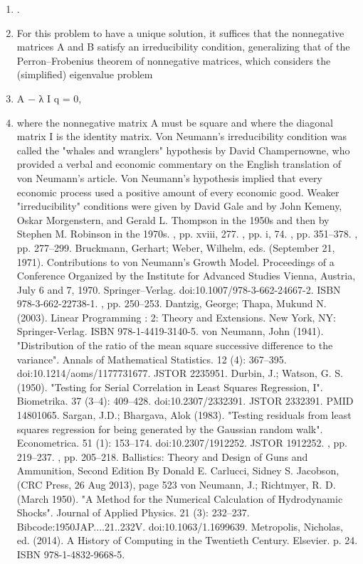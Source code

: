 \begin{enumerate}
\item .
\item For this problem to have a unique solution, it suffices that the nonnegative matrices A and B satisfy an irreducibility condition, generalizing that of the Perron–Frobenius theorem of nonnegative matrices, which considers the (simplified) eigenvalue problem
\item A − λ I q = 0,
\item where the nonnegative matrix A must be square and where the diagonal matrix I is the identity matrix. Von Neumann's irreducibility condition was called the "whales and wranglers" hypothesis by David Champernowne, who provided a verbal and economic commentary on the English translation of von Neumann's article. Von Neumann's hypothesis implied that every economic process used a positive amount of every economic good. Weaker "irreducibility" conditions were given by David Gale and by John Kemeny, Oskar Morgenstern, and Gerald L. Thompson in the 1950s and then by Stephen M. Robinson in the 1970s.
, pp. xviii, 277.
, pp. i, 74.
, pp. 351–378.
, pp. 277–299.
Bruckmann, Gerhart; Weber, Wilhelm, eds. (September 21, 1971). Contributions to von Neumann's Growth Model. Proceedings of a Conference Organized by the Institute for Advanced Studies Vienna, Austria, July 6 and 7, 1970. Springer–Verlag. doi:10.1007/978-3-662-24667-2. ISBN 978-3-662-22738-1.
, pp. 250–253.
Dantzig, George; Thapa, Mukund N. (2003). Linear Programming : 2: Theory and Extensions. New York, NY: Springer-Verlag. ISBN 978-1-4419-3140-5.
von Neumann, John (1941). "Distribution of the ratio of the mean square successive difference to the variance". Annals of Mathematical Statistics. 12 (4): 367–395. doi:10.1214/aoms/1177731677. JSTOR 2235951.
Durbin, J.; Watson, G. S. (1950). "Testing for Serial Correlation in Least Squares Regression, I". Biometrika. 37 (3–4): 409–428. doi:10.2307/2332391. JSTOR 2332391. PMID 14801065.
Sargan, J.D.; Bhargava, Alok (1983). "Testing residuals from least squares regression for being generated by the Gaussian random walk". Econometrica. 51 (1): 153–174. doi:10.2307/1912252. JSTOR 1912252.
, pp. 219–237.
, pp. 205–218.
Ballistics: Theory and Design of Guns and Ammunition, Second Edition By Donald E. Carlucci, Sidney S. Jacobson, (CRC Press, 26 Aug 2013), page 523
von Neumann, J.; Richtmyer, R. D. (March 1950). "A Method for the Numerical Calculation of Hydrodynamic Shocks". Journal of Applied Physics. 21 (3): 232–237. Bibcode:1950JAP....21..232V. doi:10.1063/1.1699639.
Metropolis, Nicholas, ed. (2014). A History of Computing in the Twentieth Century. Elsevier. p. 24. ISBN 978-1-4832-9668-5.

\end{enumerate}
